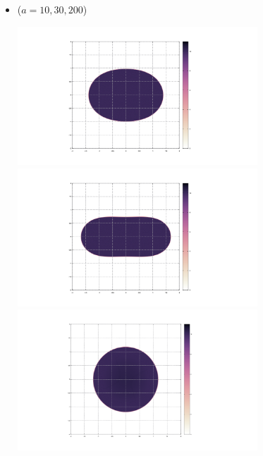\documentclass[a0paper,dvipdfmx,helvet,logo=logo.png,hlcolor=F70146]{modernposter}
\begin{document}
\begin{postercolumn}
{\begin{itemize}
      \item {} ($a=10, 30, 200$)
      \begin{center}
        \includegraphics[width=9cm]{fig2/PN300K100R10E2.png}
        \includegraphics[width=9cm]{fig2/PN300K100R30E2.png}
        \includegraphics[width=9cm]{fig3/PN300K100R200E2.png}
      \end{center}
    \end{itemize}
  }

\end{postercolumn}
\end{document}
